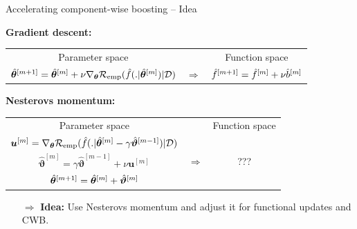 \documentclass[10pt]{beamer}
\begin{document}
\begin{frame}{Accelerating component-wise boosting -- Idea}

  \textbf{Gradient descent:}

  \vspace{0.2cm}
  {\small
  \begin{tabular}{ccc}
    Parameter space & & Function space \\[0.3cm]
    $\hat{\bm{\theta}}^{[m+1]} = \hat{\bm{\theta}}^{[m]} + \nu \nabla_{\bm{\theta}}\mathcal{R}_{\text{emp}}(\hat{f}(. | \hat{\bm{\theta}}^{[m]}) | \mathcal{D})$ & $\Rightarrow$ & $\hat{f}^{[m+1]} = \hat{f}^{[m]} + \nu \hat{b}^{[m]}$
  \end{tabular}}
  \vspace{0.4cm}

  \textbf{Nesterovs momentum:}

  \vspace{0.2cm}
  {\small
  \begin{tabular}{ccc}
    Parameter space & & Function space \\[0.3cm]
    $\bm{u}^{[m]} = \nabla_{\bm{\theta}}\mathcal{R}_{\text{emp}}(\hat{f}(. | \hat{\bm{\theta}}^{[m]} - \gamma \hat{\bm{\vartheta}}^{[m-1]}) | \mathcal{D})$ &  & \\
    $\hat{\bm{\vartheta}}^{[m]} = \gamma \hat{\bm{\vartheta}}^{[m-1]} + \nu \bm{u}^{[m]}$ & $\Rightarrow$ & ??? \\
    $\hat{\bm{\theta}}^{[m+1]} = \hat{\bm{\theta}}^{[m]} + \hat{\bm{\vartheta}}^{[m]}$ & &
  \end{tabular}}
  \vspace{0.2cm}

  \begin{itemize}
  \item[$\Rightarrow$] \textbf{Idea:} Use Nesterovs momentum and adjust it for functional updates and CWB.
  \end{itemize}

\end{frame}
\end{document}
